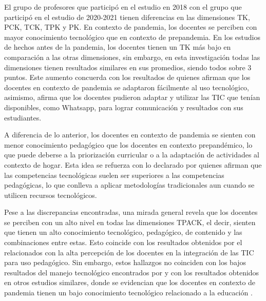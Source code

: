 \documentclass[spanish]{textolivre}
\begin{document}
El grupo de profesores que participó en el estudio en 2018 con el grupo que participó en el estudio de 2020-2021 tienen diferencias en las dimensiones TK, PCK, TCK, TPK y PK. En contexto de pandemia, los docentes se perciben con mayor conocimiento tecnológico que en contexto de prepandemia. En los estudios de \textcite{arevalo_duarte_competencias_2016,silva_teachers_2019,tapia_silva_conocimiento_2019} hechos antes de la pandemia, los docentes tienen un TK más bajo en comparación a las otras dimensiones, sin embargo, en esta investigación todas las dimensiones tienen resultados similares en sus promedios, siendo todos sobre 3 puntos. Este aumento concuerda con los resultados de \textcite[p. 12]{rocha_estrada_docentes_2022} quienes afirman que los docentes en contexto de pandemia se adaptaron fácilmente al uso tecnológico, asimismo, \textcite[p. 28]{anderete_schwal_pandemia_2021} afirma que los docentes pudieron adaptar y utilizar las TIC que tenían disponibles, como Whatsapp, para lograr comunicación y resultados con sus estudiantes.

A diferencia de lo anterior, los docentes en contexto de pandemia se sienten con menor conocimiento pedagógico que los docentes en contexto prepandémico, lo que puede deberse a la priorización curricular o a la adaptación de actividades al contexto de hogar. Esta idea se refuerza con lo declarado por \textcite{cabero_formacion_2014,suarez_rodriguez_competencias_2013} quienes afirman que las competencias tecnológicas suelen ser superiores a las competencias pedagógicas, lo que conlleva a aplicar metodologías tradicionales aun cuando se utilicen recursos tecnológicos.

Pese a las discrepancias encontradas, una mirada general revela que los docentes se perciben con un alto nivel en todas las dimensiones TPACK, el decir, sienten que tienen un alto conocimiento tecnológico, pedagógico, de contenido y las combinaciones entre estas. Esto coincide con los resultados obtenidos por el \textcite{ministerio_de_educacion_mineduc_docentes_2016} relacionados con la alta percepción de los docentes en la integración de las TIC para uso pedagógico. Sin embargo, estos hallazgos no coinciden con los bajos resultados del manejo tecnológico encontrados por \textcite{agencia_de_calidad_de_la_education_ace_estudio_2018} y con los resultados obtenidos en otros estudios similares, donde se evidencian que los docentes en contexto de pandemia tienen un bajo conocimiento tecnológico relacionado a la educación \cite{fernandez-chavez_early_2022,salcedo-lagos_teachers_2021}. 
\end{document}
